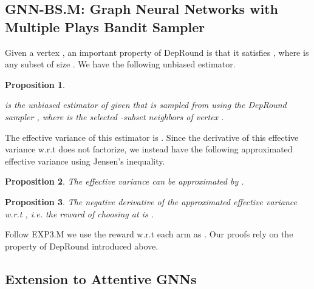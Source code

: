 \documentclass{article}
\newtheorem{proposition}{Proposition}
\begin{document}
\subsection{GNN-BS.M: Graph Neural Networks with Multiple Plays Bandit Sampler}\label{sec:bsm}


Given a vertex , an important property of DepRound is that
it satisfies 
, 
where  is any subset of size .
We have the following unbiased estimator.

\begin{proposition}\label{proposition:estimator2}
 
is the unbiased estimator of  
given that  is sampled from  using the DepRound 
sampler , where  is 
the selected -subset neighbors of vertex .
\end{proposition}
The effective variance of this estimator is 
.
Since the derivative of this effective variance w.r.t
 does not factorize, we instead have 
the following approximated effective variance 
using Jensen's inequality.
\begin{proposition}\label{proposition:mp_var_bound}
The effective variance can be approximated by .
\end{proposition}
\begin{proposition}\label{proposition:mp_derivative}
The negative derivative of the approximated effective variance  w.r.t ,
i.e. the reward of  choosing  at  is
.
\end{proposition}
Follow EXP3.M we use the reward w.r.t each arm as 
.
Our proofs rely on the property of DepRound introduced above.


\begin{comment}
We describe our second training algorithm in Algorithm~\ref{alg:train_gnn}.
We sample the layers
in a top-down manner with DepRound. We calculate the unbiased estimator
using Proposition~\ref{proposition:estimator2}.
After we update the GNN model, we calculate the reward derived 
in Eq.~\eqref{eq:reward2}. Finally we update the sampling distribution based 
on Algorithm~\ref{alg:exp3m} (\textbf{EXP3.M}~\cite{uchiya2010algorithms}) 
in Appendix~\ref{appendix:alg}.
\end{comment}


\subsection{Extension to Attentive GNNs}
\begin{comment}
Another advantage of our formulation is that, our samplers
can be naturally applied to attentive graph neural networks
where the attention values 's vary constantly
during the training procedure. Existing approaches cannot
evaluate Eq.~\eqref{eq:optimal_q} since they need to calculate
those 's before calculating the sampling distribution.
However, in our case, as long as our reward or regret 
can factorize with respect to hidden embedding 
or these learned weights , our approaches
can still apply to such architectures.
\end{comment}
\end{document}
